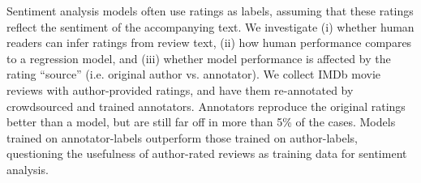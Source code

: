 Sentiment analysis models often use ratings as labels, assuming that these ratings reflect the sentiment of the accompanying text. We investigate (i) whether human readers can infer ratings from review text, (ii) how human performance compares to a regression model, and (iii) whether model performance is affected by the rating ``source'' (i.e. original author vs. annotator). We collect IMDb movie reviews with author-provided ratings, and have them re-annotated by crowdsourced and trained annotators. Annotators reproduce the original ratings better than a model, but are still far off in more than 5\% of the cases. Models trained on annotator-labels outperform those trained on author-labels, questioning the usefulness of author-rated reviews as training data for sentiment analysis.
